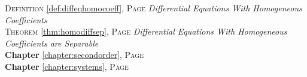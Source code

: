 \begin{multicols}{2}
{\textsc{Definition} \ref{def:diffeqhomocoeff}, \textsc{Page} \pageref{def:diffeqhomocoeff} \textit{Differential Equations With Homogeneous Coefficients} \\
\textsc{Theorem} \ref{thm:homodiffsep}, \textsc{Page} \pageref{thm:homodiffsep} \textit{Differential Equations With Homogeneous Coefficients are Separable} \\
\textbf{Chapter} \ref{chapter:secondorder}, \textsc{Page} \pageref{chapter:secondorder} \\
\textbf{Chapter} \ref{chapter:systems}, \textsc{Page} \pageref{chapter:systems} \\

      }
\end{multicols}

